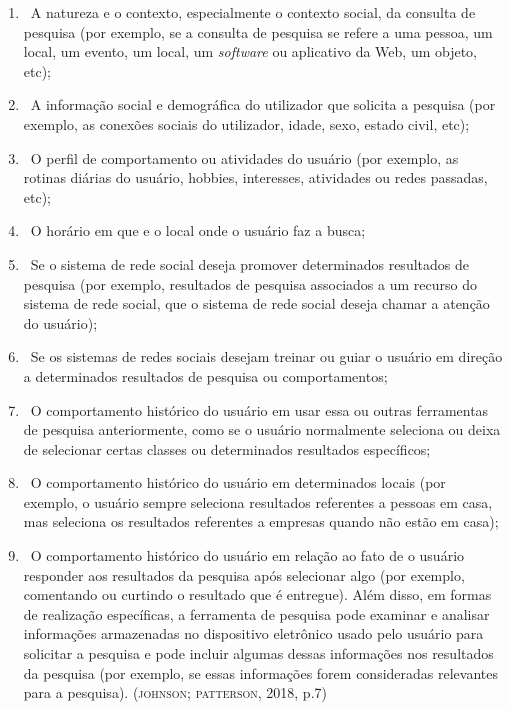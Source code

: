 \begin{enumerate}
\item\, A natureza e o contexto, especialmente o contexto social, da consulta de pesquisa (por exemplo, se a consulta de pesquisa se refere a uma pessoa, um local, um evento, um local, um \textit{software} ou aplicativo da Web, um objeto, etc);
\item\, A informação social e demográfica do utilizador que solicita a pesquisa (por exemplo, as conexões sociais do utilizador, idade, sexo, estado civil, etc);
\item\, O perfil de comportamento ou atividades do usuário (por exemplo, as rotinas diárias do usuário, hobbies, interesses, atividades ou redes passadas, etc);
\item\, O horário em que e o local onde o usuário faz a busca; 
\item\, Se o sistema de rede social deseja promover determinados resultados de pesquisa (por exemplo, resultados de pesquisa associados a um recurso do sistema de rede social, que o sistema de rede social deseja chamar a atenção do usuário);
\item\, Se os sistemas de redes sociais desejam treinar ou guiar o usuário em direção a determinados resultados de pesquisa ou comportamentos;
\item\, O comportamento histórico do usuário em usar essa ou outras ferramentas de pesquisa anteriormente, como se o usuário normalmente seleciona ou deixa de selecionar certas classes ou determinados resultados específicos;
\item\, O comportamento histórico do usuário em determinados locais (por exemplo, o usuário sempre seleciona resultados referentes a pessoas em casa, mas seleciona os resultados referentes a empresas quando não estão em casa);
\item\, O comportamento histórico do usuário em relação ao fato de o usuário responder aos resultados da pesquisa após selecionar algo (por exemplo, comentando ou curtindo o resultado que é entregue). Além disso, em formas de realização específicas, a ferramenta de pesquisa pode examinar e analisar informações armazenadas no dispositivo eletrônico usado pelo usuário para solicitar a pesquisa e pode incluir algumas dessas informações nos resultados da pesquisa (por exemplo, se essas informações forem consideradas relevantes para a pesquisa). (\textsc{johnson; patterson}, 2018, p.7) 
\end{enumerate}

